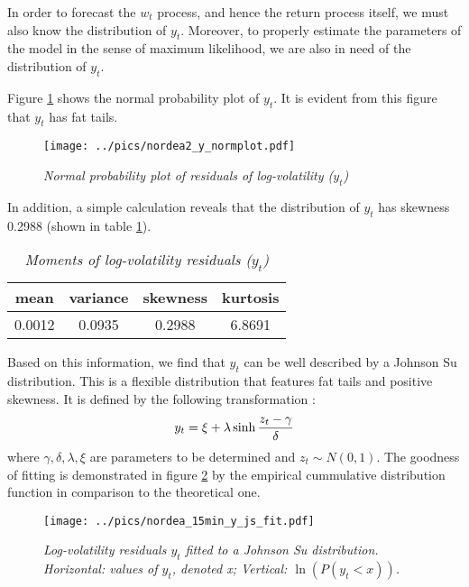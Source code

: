 In order to forecast the $w_t$ process, and hence the return process
itself, we must also know the distribution of $y_t$. Moreover, to
properly estimate the parameters of the model in the sense of maximum
likelihood, we are also in need of the distribution of $y_t$.

Figure \ref{fig:nordea_15min_y_qq} shows the normal probability plot of
$y_t$. It is evident from this figure that $y_t$ has fat tails.
\begin{figure}[htb!]
  \centering
  \texttt{[image: ../pics/nordea2\_y\_normplot.pdf]}
  \caption{\small \it Normal probability plot of residuals of
    log-volatility ($y_t$)}
  \label{fig:nordea_15min_y_qq}
\end{figure}
In addition, a simple calculation reveals that the distribution of
$y_t$ has skewness 0.2988 (shown in table
\ref{tab:nordea_15min_y_moments}).
\begin{table}[htb!]
  \centering
  \begin{tabular}{|c|c|c|c|}
    \hline
    mean & variance & skewness & kurtosis \\
    \hline
    0.0012 & 0.0935 & 0.2988 & 6.8691 \\
    \hline
  \end{tabular}
  \caption{\small \it Moments of log-volatility residuals ($y_t$)}
  \label{tab:nordea_15min_y_moments}
\end{table}
Based on this information, we find that $y_t$ can be well
described by a Johnson Su distribution. This is a flexible
distribution that features fat tails and positive skewness. It is
defined by the following transformation \cite{Shang2004}:
\[
  y_t = \xi + \lambda\sinh{z_t - \gamma \over \delta}
\]
where $\gamma, \delta, \lambda, \xi$ are parameters to be determined
and $z_t \sim N(0, 1)$. The goodness of fitting is demonstrated in
figure \ref{fig:nordea_15min_y_js_fit} by the
empirical cummulative distribution function in comparison to the
theoretical one.
\begin{figure}[htb!]
  \centering
    \texttt{[image: ../pics/nordea\_15min\_y\_js\_fit.pdf]}
    \caption{\small \it Log-volatility residuals $y_t$ fitted to a
      Johnson Su distribution. Horizontal: values of $y_t$, denoted x;
      Vertical: $\ln\left(P(y_t < x)\right)$.}
    \label{fig:nordea_15min_y_js_fit}
\end{figure}

